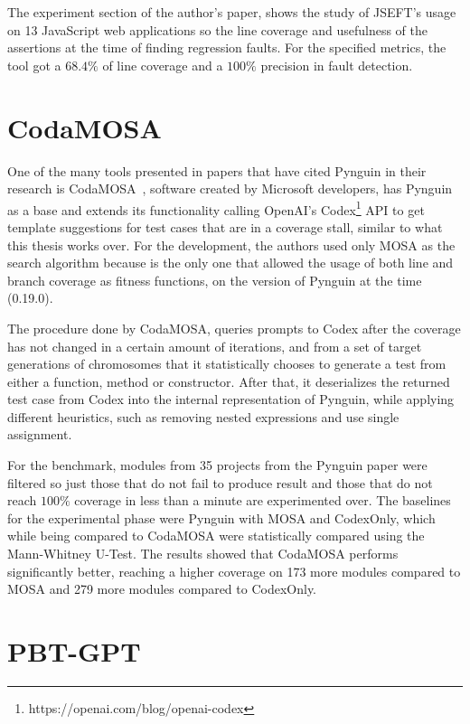 \documentclass[%
  chapterprefix=false,%
  open=right,%
  twoside=true,%
  paper=a4,%
  logofile={Figures/logo.png},%
  thesistype=master,%
  UKenglish,%
]{se2thesis}
\begin{document}
The experiment section of the author's paper, shows the study of JSEFT's usage on 13 JavaScript web applications so the line coverage and usefulness of the assertions at the time of finding regression faults.
For the specified metrics, the tool got a \(68.4\%\) of line coverage and a \(100\%\) precision in fault detection.

\section{CodaMOSA}

One of the many tools presented in papers that have cited Pynguin in their research is CodaMOSA~\cite{DBLP:conf/icse/LemieuxILS23}, software created by Microsoft developers, has Pynguin as a base and extends its functionality calling OpenAI's Codex\footnote{https://openai.com/blog/openai-codex} API to get template suggestions for test cases that are in a coverage stall, similar to what this thesis works over.
For the development, the authors used only MOSA as the search algorithm because is the only one that allowed the usage of both line and branch coverage as fitness functions, on the version of Pynguin at the time (0.19.0).

The procedure done by CodaMOSA, queries prompts to Codex after the coverage has not changed in a certain amount of iterations, and from a set of target generations of chromosomes that it statistically chooses to generate a test from either a function, method or constructor.
After that, it deserializes the returned test case from Codex into the internal representation of Pynguin, while applying different heuristics, such as removing nested expressions and use single assignment.

For the benchmark, modules from 35 projects from the Pynguin paper were filtered so just those that do not fail to produce result and those that do not reach \(100\%\) coverage in less than a minute are experimented over.
The baselines for the experimental phase were Pynguin with MOSA and CodexOnly, which while being compared to CodaMOSA were statistically compared using the Mann-Whitney U-Test.
The results showed that CodaMOSA performs significantly better, reaching a higher coverage on 173 more modules compared to MOSA and 279 more modules compared to CodexOnly.

\section{PBT-GPT}
\end{document}
